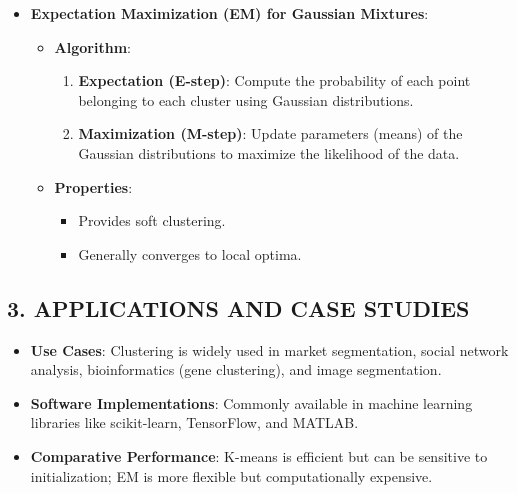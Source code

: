 \documentclass[
  12pt,
]{report}
\providecommand{\tightlist}{%
  \setlength{\itemsep}{0pt}\setlength{\parskip}{0pt}}
\begin{document}
\begin{itemize}
\begin{itemize}
    \begin{itemize}
    \tightlist
    \item
      Converges to local minima.
    \item
      Sensitive to initialization (can be improved with techniques like k-means++).
    \end{itemize}
  \end{itemize}
\item
  \textbf{Expectation Maximization (EM) for Gaussian Mixtures}:

  \begin{itemize}
  \tightlist
  \item
    \textbf{Algorithm}:

    \begin{enumerate}
    \def\labelenumi{\arabic{enumi}.}
    \tightlist
    \item
      \textbf{Expectation (E-step)}: Compute the probability of each point belonging to each cluster using Gaussian distributions.
    \item
      \textbf{Maximization (M-step)}: Update parameters (means) of the Gaussian distributions to maximize the likelihood of the data.
    \end{enumerate}
  \item
    \textbf{Properties}:

    \begin{itemize}
    \tightlist
    \item
      Provides soft clustering.
    \item
      Generally converges to local optima.
    \end{itemize}
  \end{itemize}
\end{itemize}

\subsection{3. APPLICATIONS AND CASE STUDIES}\label{applications-and-case-studies-1}

\begin{itemize}
\tightlist
\item
  \textbf{Use Cases}: Clustering is widely used in market segmentation, social network analysis, bioinformatics (gene clustering), and image segmentation.
\item
  \textbf{Software Implementations}: Commonly available in machine learning libraries like scikit-learn, TensorFlow, and MATLAB.
\item
  \textbf{Comparative Performance}: K-means is efficient but can be sensitive to initialization; EM is more flexible but computationally expensive.
\end{itemize}
\end{document}
